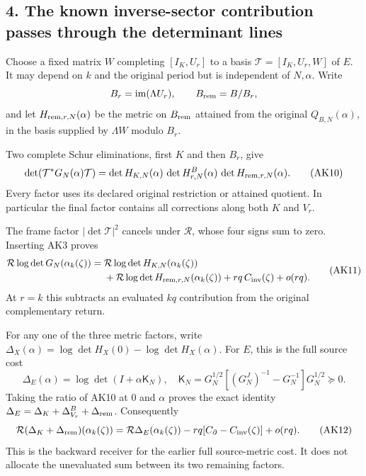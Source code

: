 \subsection{4. The known inverse-sector contribution passes through the determinant lines}\label{the-known-inverse-sector-contribution-passes-through-the-determinant-lines}

Choose a fixed matrix \(W\) completing \([I_K,U_r]\) to a basis \(\mathcal T=[I_K,U_r,W]\) of \(E\). It may depend on \(k\) and the original period but is independent of \(N,\alpha\). Write \[
B_r=\operatorname{im}(\Lambda U_r),\qquad
B_{\rm rem}=B/B_r,
\] and let \(H_{{\rm rem},r,N}(\alpha)\) be the metric on \(B_{\rm rem}\) attained from the original \(Q_{B,N}(\alpha)\), in the basis supplied by \(\Lambda W\) modulo \(B_r\).

Two complete Schur eliminations, first \(K\) and then \(B_r\), give \[
\det(\mathcal T^*G_N(\alpha)\mathcal T)
=\det H_{K,N}(\alpha)\,
 \det H^B_{r,N}(\alpha)\,
 \det H_{{\rm rem},r,N}(\alpha).
\tag{AK10}
\] Every factor uses its declared original restriction or attained quotient. In particular the final factor contains all corrections along both \(K\) and \(V_r\).

The frame factor \(|\det\mathcal T|^2\) cancels under \(\mathcal R\), whose four signs sum to zero. Inserting AK3 proves \[
\begin{split}
\mathcal R\log\det G_N(\alpha_k(\zeta))
={}&\mathcal R\log\det H_{K,N}(\alpha_k(\zeta))\\
 &+\mathcal R\log\det H_{{\rm rem},r,N}(\alpha_k(\zeta))
 +rq\,C_{\rm inv}(\zeta)+o(rq).
\end{split}\tag{AK11}
\] At \(r=k\) this subtracts an evaluated \(kq\) contribution from the original complementary return.

For any one of the three metric factors, write \(\Delta_X(\alpha)=\log\det H_X(0)-\log\det H_X(\alpha)\). For \(E\), this is the full source cost \[
\Delta_E(\alpha)=\log\det(I+\alpha\mathsf K_N),\quad
\mathsf K_N=G_N^{1/2}[(G_N^J)^{-1}-G_N^{-1}]G_N^{1/2}\succeq0.
\] Taking the ratio of AK10 at \(0\) and \(\alpha\) proves the exact identity \(\Delta_E=\Delta_K+\Delta_{V_r}^B+\Delta_{\rm rem}\). Consequently \[
\mathcal R(\Delta_K+\Delta_{\rm rem})(\alpha_k(\zeta))
=\mathcal R\Delta_E(\alpha_k(\zeta))
-rq[C_\partial-C_{\rm inv}(\zeta)]+o(rq).
\tag{AK12}
\] This is the backward receiver for the earlier full source-metric cost. It does not allocate the unevaluated sum between its two remaining factors.

